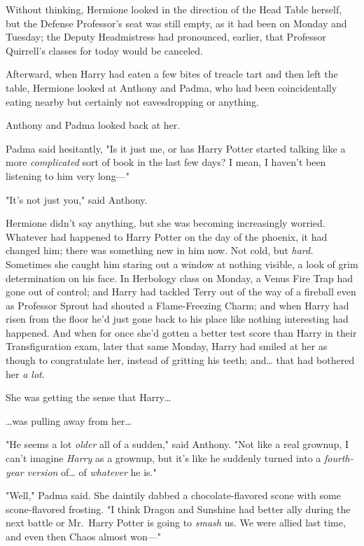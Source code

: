 Without thinking, Hermione looked in the direction of the Head Table herself, 
but the Defense Professor's seat was still empty, as it had been on Monday and 
Tuesday; the Deputy Headmistress had pronounced, earlier, that Professor 
Quirrell's classes for today would be canceled.

Afterward, when Harry had eaten a few bites of treacle tart and then left the 
table, Hermione looked at Anthony and Padma, who had been coincidentally eating 
nearby but certainly not eavesdropping or anything.

Anthony and Padma looked back at her.

Padma said hesitantly, "Is it just me, or has Harry Potter started talking like 
a more \emph{complicated} sort of book in the last few days? I mean, I haven't 
been listening to him very long---"

"It's not just you," said Anthony.

Hermione didn't say anything, but she was becoming increasingly worried. 
Whatever had happened to Harry Potter on the day of the phoenix, it had changed 
him; there was something new in him now. Not cold, but \emph{hard.} Sometimes 
she caught him staring out a window at nothing visible, a look of grim 
determination on his face. In Herbology class on Monday, a Venus Fire Trap had 
gone out of control; and Harry had tackled Terry out of the way of a fireball 
even as Professor Sprout had shouted a Flame-Freezing Charm; and when Harry had 
risen from the floor he'd just gone back to his place like nothing interesting 
had happened. And when for once she'd gotten a better test score than Harry in 
their Transfiguration exam, later that same Monday, Harry had smiled at her as 
though to congratulate her, instead of gritting his teeth; and{\ldots} that had 
bothered her \emph{a lot}.

She was getting the sense that Harry{\ldots}

{\ldots}was pulling away from her{\ldots}

"He seems a lot \emph{older} all of a sudden," said Anthony. "Not like a real 
grownup, I can't imagine \emph{Harry} as a grownup, but it's like he suddenly 
turned into a \emph{fourth-year version} of{\ldots} of \emph{whatever} he is."

"Well," Padma said. She daintily dabbed a chocolate-flavored scone with some 
scone-flavored frosting. "I think Dragon and Sunshine had better ally during 
the next battle or Mr.~Harry Potter is going to \emph{smash} us. We were allied 
last time, and even then Chaos almost won---"

